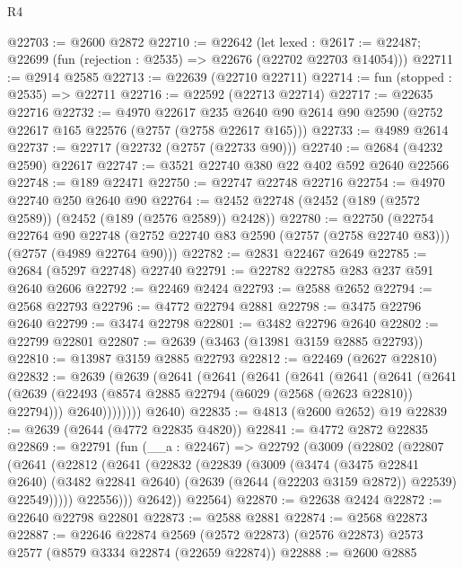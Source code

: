 \begin{lexlean}{R4}
\begin{coremodule}
@22703 := @2600 @2872
@22710 := @22642
    (let lexed : @2617 := @22487; @22699 (fun (rejection : @2535) => @22676 (@22702 @22703 @14054)))
@22711 := @2914 @2585
@22713 := @22639 (@22710 @22711)
@22714 := fun (stopped : @2535) => @22711
@22716 := @22592 (@22713 @22714)
@22717 := @22635 @22716
@22732 := @4970
    @22617
    @235
    @2640
    @90
    @2614
    @90
    @2590
    (@2752 @22617 @165 @22576 (@2757 (@2758 @22617 @165)))
@22733 := @4989 @2614
@22737 := @22717 (@22732 (@2757 (@22733 @90)))
@22740 := @2684 (@4232 @2590) @22617
@22747 := @3521 @22740 @380 @22 @402 @592 @2640 @22566
@22748 := @189 @22471
@22750 := @22747 @22748 @22716
@22754 := @4970 @22740 @250 @2640 @90
@22764 := @2452 @22748 (@2452 (@189 (@2572 @2589)) (@2452 (@189 (@2576 @2589)) @2428))
@22780 := @22750
    (@22754
      @22764
      @90
      @22748
      (@2752 @22740 @83 @2590 (@2757 (@2758 @22740 @83)))
      (@2757 (@4989 @22764 @90)))
@22782 := @2831 @22467 @2649
@22785 := @2684 (@5297 @22748) @22740
@22791 := @22782 @22785 @283 @237 @591 @2640 @2606
@22792 := @22469 @2424
@22793 := @2588 @2652
@22794 := @2568 @22793
@22796 := @4772 @22794 @2881
@22798 := @3475 @22796 @2640
@22799 := @3474 @22798
@22801 := @3482 @22796 @2640
@22802 := @22799 @22801
@22807 := @2639 (@3463 (@13981 @3159 @2885 @22793))
@22810 := @13987 @3159 @2885 @22793
@22812 := @22469 (@2627 @22810)
@22832 := @2639
    (@2639
      (@2641
        (@2641
          (@2641
            (@2641
              (@2641
                (@2641
                  (@2641
                    (@2639
                      (@22493 (@8574 @2885 @22794 (@6029 (@2568 (@2623 @22810)) @22794)))
                      @2640))))))))
      @2640)
@22835 := @4813 (@2600 @2652) @19
@22839 := @2639 (@2644 (@4772 @22835 @4820))
@22841 := @4772 @2872 @22835
@22869 := @22791
    (fun (__a : @22467) =>
    @22792
      (@3009
        (@22802
          (@22807
            (@2641
              (@22812
                (@2641
                  (@22832
                    (@22839
                      (@3009
                        (@3474
                          (@3475 @22841 @2640)
                          (@3482 @22841 @2640)
                          (@2639 (@2644 (@22203 @3159 @2872)) @22539)
                          @22549)))))
                @22556)))
          @2642))
      @22564)
@22870 := @22638 @2424
@22872 := @22640 @22798 @22801
@22873 := @2588 @2881
@22874 := @2568 @22873
@22887 := @22646
    @22874
    @2569
    (@2572 @22873)
    (@2576 @22873)
    @2573
    @2577
    (@8579 @3334 @22874 (@22659 @22874))
@22888 := @2600 @2885

\end{coremodule}
\end{lexlean}
